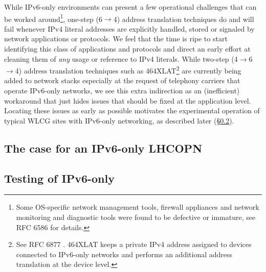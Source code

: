 While IPv6-only environments can present a few operational challenges that
can be worked around\footnote{Some OS-specific network management tools,
firewall appliances and network monitoring and diagnostic tools were found
to be defective or immature, see RFC 6586 \cite{rfc} for details.},
one-step (6$\rightarrow$4) address translation techniques do and will fail whenever 
IPv4 literal addresses are explicitly handled, stored or signaled by
network applications or protocols. We feel that the time is ripe to
start identifying this class of applications and protocols and direct an early effort
at cleaning them of {\it any} usage or reference to IPv4 literals. While 
two-step (4$\rightarrow$6$\rightarrow$4) address translation techniques
such as 464XLAT\footnote{See RFC 6877 \cite{rfc}. 464XLAT keeps a private
IPv4 address assigned to devices connected to IPv6-only networks and
performs an additional address translation at the device level.}
are currently being added to 
network stacks especially at the request of telephony carriers that operate
IPv6-only networks, we see this extra indirection as an (inefficient)
workaround that just hides issues that should be fixed at the application
level. Locating these issues as early as possible motivates the experimental
operation of typical
WLCG sites with IPv6-only networking, as described
later (\S \ref{ssec:ipv6onlytest}).

\subsection{The case for an IPv6-only LHCOPN}


\subsection{Testing of IPv6-only}
\label{ssec:ipv6onlytest}


